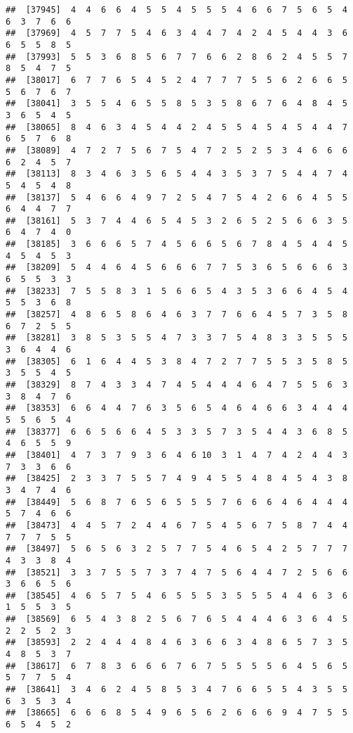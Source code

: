 \documentclass[
]{book}
\begin{document}
\begin{verbatim}
##  [37945]  4  4  6  6  4  5  5  4  5  5  5  4  6  6  7  5  6  5  4  6  3  7  6  6
##  [37969]  4  5  7  7  5  4  6  3  4  4  7  4  2  4  5  4  4  3  6  6  5  5  8  5
##  [37993]  5  5  3  6  8  5  6  7  7  6  6  2  8  6  2  4  5  5  7  8  5  4  7  5
##  [38017]  6  7  7  6  5  4  5  2  4  7  7  7  5  5  6  2  6  6  5  5  6  7  6  7
##  [38041]  3  5  5  4  6  5  5  8  5  3  5  8  6  7  6  4  8  4  5  3  6  5  4  5
##  [38065]  8  4  6  3  4  5  4  4  2  4  5  5  4  5  4  5  4  4  7  6  5  7  6  8
##  [38089]  4  7  2  7  5  6  7  5  4  7  2  5  2  5  3  4  6  6  6  6  2  4  5  7
##  [38113]  8  3  4  6  3  5  6  5  4  4  3  5  3  7  5  4  4  7  4  5  4  5  4  8
##  [38137]  5  4  6  6  4  9  7  2  5  4  7  5  4  2  6  6  4  5  5  6  4  4  7  7
##  [38161]  5  3  7  4  4  6  5  4  5  3  2  6  5  2  5  6  6  3  5  6  4  7  4  0
##  [38185]  3  6  6  6  5  7  4  5  6  6  5  6  7  8  4  5  4  4  5  4  5  4  5  3
##  [38209]  5  4  4  6  4  5  6  6  6  7  7  5  3  6  5  6  6  6  3  6  5  5  3  3
##  [38233]  7  5  5  8  3  1  5  6  6  5  4  3  5  3  6  6  4  5  4  5  5  3  6  8
##  [38257]  4  8  6  5  8  6  4  6  3  7  7  6  6  4  5  7  3  5  8  6  7  2  5  5
##  [38281]  3  8  5  3  5  5  4  7  3  3  7  5  4  8  3  3  5  5  5  3  6  4  4  6
##  [38305]  6  1  6  4  4  5  3  8  4  7  2  7  7  5  5  3  5  8  5  3  5  5  4  5
##  [38329]  8  7  4  3  3  4  7  4  5  4  4  4  6  4  7  5  5  6  3  3  8  4  7  6
##  [38353]  6  6  4  4  7  6  3  5  6  5  4  6  4  6  6  3  4  4  4  5  5  6  5  4
##  [38377]  6  6  5  6  6  4  5  3  3  5  7  3  5  4  4  3  6  8  5  4  6  5  5  9
##  [38401]  4  7  3  7  9  3  6  4  6 10  3  1  4  7  4  2  4  4  3  7  3  3  6  6
##  [38425]  2  3  3  7  5  5  7  4  9  4  5  5  4  8  4  5  4  3  8  3  4  7  4  6
##  [38449]  5  6  8  7  6  5  6  5  5  5  7  6  6  6  4  6  4  4  4  5  7  4  6  6
##  [38473]  4  4  5  7  2  4  4  6  7  5  4  5  6  7  5  8  7  4  4  7  7  7  5  5
##  [38497]  5  6  5  6  3  2  5  7  7  5  4  6  5  4  2  5  7  7  7  4  3  3  8  4
##  [38521]  3  3  7  5  5  7  3  7  4  7  5  6  4  4  7  2  5  6  6  3  6  6  5  6
##  [38545]  4  6  5  7  5  4  6  5  5  5  3  5  5  5  4  4  6  3  6  1  5  5  3  5
##  [38569]  6  5  4  3  8  2  5  6  7  6  5  4  4  4  6  3  6  4  5  2  2  5  2  3
##  [38593]  2  2  4  4  4  8  4  6  3  6  6  3  4  8  6  5  7  3  5  4  8  5  3  7
##  [38617]  6  7  8  3  6  6  6  7  6  7  5  5  5  5  6  4  5  6  5  5  7  7  5  4
##  [38641]  3  4  6  2  4  5  8  5  3  4  7  6  6  5  5  4  3  5  5  6  3  5  3  4
##  [38665]  6  6  6  8  5  4  9  6  5  6  2  6  6  6  9  4  7  5  5  6  5  4  5  2

\end{verbatim}
\end{document}
